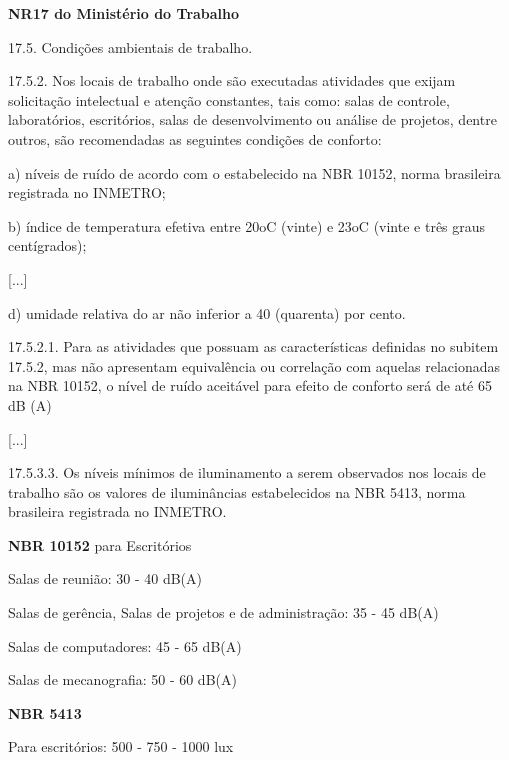 \documentclass[]{politex}
\begin{document}
\begin{citacaoLonga} %
\textbf{NR17 do Ministério do Trabalho} \cite{NR17}

17.5. Condições ambientais de trabalho.

17.5.2. Nos locais de trabalho onde são executadas atividades que exijam solicitação intelectual e atenção constantes, tais como: salas de controle, laboratórios, escritórios, salas de desenvolvimento ou análise de projetos, dentre outros, são recomendadas as seguintes condições de conforto:

a) níveis de ruído de acordo com o estabelecido na NBR 10152, norma brasileira registrada no INMETRO;

b) índice de temperatura efetiva entre 20oC (vinte) e 23oC (vinte e três graus centígrados);

[...]

d) umidade relativa do ar não inferior a 40 (quarenta) por cento.

17.5.2.1. Para as atividades que possuam as características definidas no subitem 17.5.2, mas não apresentam equivalência ou correlação com aquelas relacionadas na NBR 10152, o nível de ruído aceitável para efeito de conforto será de até 65 dB (A)

[...]

17.5.3.3. Os níveis mínimos de iluminamento a serem observados nos locais de trabalho são os valores de iluminâncias estabelecidos na NBR 5413, norma brasileira registrada no INMETRO.
\end{citacaoLonga}

\begin{citacaoLonga} %

\textbf{NBR 10152} \cite{NBR10152} para Escritórios

Salas de reunião: 30 - 40 dB(A)

Salas de gerência, Salas de projetos e de administração: 35 - 45 dB(A)

Salas de computadores: 45 - 65 dB(A)

Salas de mecanografia: 50 - 60 dB(A)

\textbf{NBR 5413} \cite{NBR5413}

Para escritórios: 500 - 750 - 1000 lux
\end{citacaoLonga}
\end{document}
